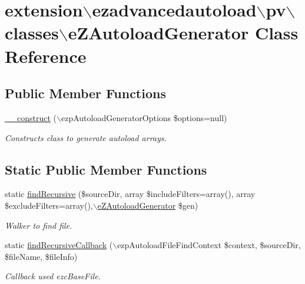 \hypertarget{classextension_1_1ezadvancedautoload_1_1pv_1_1classes_1_1e_z_autoload_generator}{\section{extension$\backslash$ezadvancedautoload$\backslash$pv$\backslash$classes$\backslash$e\-Z\-Autoload\-Generator Class Reference}
\label{classextension_1_1ezadvancedautoload_1_1pv_1_1classes_1_1e_z_autoload_generator}
}
\subsection*{Public Member Functions}
\begin{DoxyCompactItemize}
\item 
\hyperlink{classextension_1_1ezadvancedautoload_1_1pv_1_1classes_1_1e_z_autoload_generator_ae74a5ac61349b54be1777fda45022161}{\-\_\-\-\_\-construct} ($\backslash$ezp\-Autoload\-Generator\-Options \$options=null)
\begin{DoxyCompactList}\small\item\em Constructs class to generate autoload arrays. \end{DoxyCompactList}\end{DoxyCompactItemize}
\subsection*{Static Public Member Functions}
\begin{DoxyCompactItemize}
\item 
static \hyperlink{classextension_1_1ezadvancedautoload_1_1pv_1_1classes_1_1e_z_autoload_generator_a14dc03f8b1771fe4bba821f803f29b18}{find\-Recursive} (\$source\-Dir, array \$include\-Filters=array(), array \$exclude\-Filters=array(),$\backslash$\hyperlink{classextension_1_1ezadvancedautoload_1_1pv_1_1classes_1_1e_z_autoload_generator}{e\-Z\-Autoload\-Generator} \$gen)
\begin{DoxyCompactList}\small\item\em Walker to find file. \end{DoxyCompactList}\item 
static \hyperlink{classextension_1_1ezadvancedautoload_1_1pv_1_1classes_1_1e_z_autoload_generator_a300416501317475b3468ff5862cc0835}{find\-Recursive\-Callback} ($\backslash$ezp\-Autoload\-File\-Find\-Context \$context, \$source\-Dir, \$file\-Name, \$file\-Info)
\begin{DoxyCompactList}\small\item\em Callback used ezc\-Base\-File. \end{DoxyCompactList}\end{DoxyCompactItemize}
